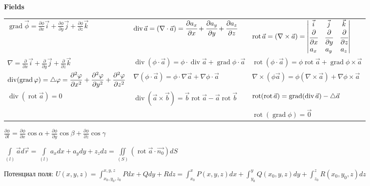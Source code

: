 \begin{center}
    \textbf{Fields}
\end{center}


\begin{tabular}{|l|l|l|}
    $\displaystyle\operatorname{grad}{\vec{\phi}} = \frac{\partial{\phi}}{\partial{x}}\vec{i}+\frac{\partial{\phi}}{\partial{y}}\vec{j}+\frac{\partial{\phi}}{\partial{z}}\vec{k}$
    &
    $\displaystyle \operatorname{div}\vec{a} = (\nabla\cdot\vec{a}) = \cfrac{\partial a_x}{\partial x} + \cfrac{\partial a_y}{\partial y}+\cfrac{\partial a_z}{\partial z}$
    & 
    $\displaystyle\operatorname{rot}\vec{a} = (\nabla\times\vec{a})=
    \begin{vmatrix}
    \vec{i} & \vec{j} & \vec{k} \\
    \cfrac{\partial}{\partial x} & \cfrac{\partial}{\partial y} &
    \cfrac{\partial}{\partial z} \\
    a_x & a_y & a_z
    \end{vmatrix}$
    \\
    
    $\displaystyle\nabla=\frac{\partial}{\partial{x}}\vec{i}+\frac{\partial}{\partial{y}}\vec{j}+\frac{\partial}{\partial{z}}\vec{k}$
    &
    $\displaystyle\operatorname{div}(\phi\cdot\vec{a}) = \phi\cdot\operatorname{div}\vec{a}+\operatorname{grad}{\phi}\cdot\vec{a}$
    & 
    $\displaystyle\operatorname{rot}(\phi\cdot\vec{a}) = \phi\operatorname{rot}\vec{a}+\operatorname{grad}\phi\times\vec{a}$
    \\
    
    $\displaystyle\operatorname{div}(\operatorname{grad}\varphi) = \mathop{}\!\mathbin\bigtriangleup\varphi = \frac{\partial^2\varphi}{\partial{x^2}} + \frac{\partial^2\varphi}{\partial{y^2}} + \frac{\partial^2\varphi}{\partial{z^2}}$
    &
    $\displaystyle\nabla{(\phi\cdot\vec{a})} = \phi\cdot\nabla\vec{a}+\nabla\phi\cdot\vec{a}$
    &
    $\displaystyle\nabla\times(\phi\vec{a}) = \phi(\nabla\times\vec{a})+\nabla\phi\times\vec{a}$
    \\
    
    $\displaystyle\operatorname{div}(\operatorname{rot}\vec{a}) = 0$
    &
    $\displaystyle\operatorname{div}(\vec{a}\times\vec{b}) = \vec{b}\operatorname{rot}\vec{a}-\vec{a}\operatorname{rot}\vec{b}$
    & 
    $\displaystyle\operatorname{rot}(\operatorname{rot}\vec{a}) = \operatorname{grad}(\operatorname{div}\vec{a}) - \mathop{}\!\mathbin\bigtriangleup\vec{a}$
    \\
    
    &
    &
    $\displaystyle\operatorname{rot}(\operatorname{grad}\phi) = \vec{0}$
    \\
\end{tabular}

$\displaystyle\frac{\partial\phi}{\partial{l}} = \frac{\partial\phi}{\partial{x}}\cos{\alpha} + \frac{\partial\phi}{\partial{y}}\cos{\beta} + \frac{\partial\phi}{\partial{z}}\cos{\gamma}$

$\displaystyle\int\limits_{(l)}\vec{a}d\vec{r} = \int\limits_{(l)}a_xdx+a_ydy+z_zdz = \iint\limits_{(S)}(\operatorname{rot}\vec{a}\cdot\vec{n_0})dS$

Потенциал поля: $\displaystyle
U(x,y,z) = \int_{x_0, y_0, z_0}^{x,y,z} Pdx+Qdy+Rdz =
\int_{x_0}^{x} P(x,y,z)dx + \int_{y_0}^{y}Q(x_0,y,z)dy +
\int_{z_0}^{z} R(x_0,y_0,z)dz$

